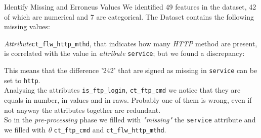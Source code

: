 \documentclass[12pt,aspectratio=169,notheorems]{beamer}
\begin{document}
\begin{frame}{Identify Missing and Erroneus Values }
        \scriptsize 
        We identified 49 features in the dataset, 42 of which are numerical and 7 are categorical.
        The Dataset contains the following missing values: 
        \begin{table}[]
            \centering
        \end{table}        
        \emph{Attribute}\texttt{ct\_flw\_http\_mthd}, that indicates how many \emph{HTTP} method are present, is correlated with 
        the value  in \emph{attribute} \texttt{service}; but we found a discrepancy:
        \begin{table}[]
            \centering
        \end{table}
        This means that the difference '242' that are signed as missing in \texttt{service} can be set to \texttt{http}.  \\
        \vspace{2ex}
        Analysing the attributes \texttt{is\_ftp\_login}, \texttt{ct\_ftp\_cmd} we notice that they are equals in number, in values and in raws.  
        Probably one of them is wrong, even if not anyway the attributes together are redundant.
        \vspace{2ex}\\
        So in the \emph{pre-processing} phase we filled with \emph{"missing"} the \texttt{service} attribute and we filled with \emph{0} \texttt{ct\_ftp\_cmd} and \texttt{ct\_flw\_http\_mthd}.
\end{frame}
\end{document}
